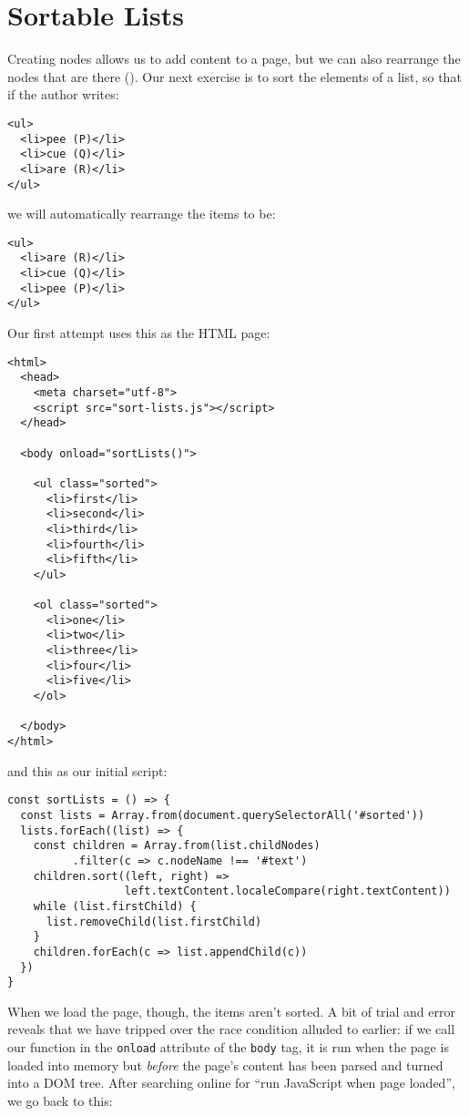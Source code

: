 \section{Sortable Lists}\label{s:pages-sort-list}

Creating nodes allows us to add content to a page,
but we can also rearrange the nodes that are there ().
Our next exercise is to sort the elements of a list,
so that if the author writes:

\begin{verbatim}
<ul>
  <li>pee (P)</li>
  <li>cue (Q)</li>
  <li>are (R)</li>
</ul>
\end{verbatim}

\noindent
we will automatically rearrange the items to be:

\begin{verbatim}
<ul>
  <li>are (R)</li>
  <li>cue (Q)</li>
  <li>pee (P)</li>
</ul>
\end{verbatim}

Our first attempt uses this as the HTML page:

\begin{verbatim}
<html>
  <head>
    <meta charset="utf-8">
    <script src="sort-lists.js"></script>
  </head>

  <body onload="sortLists()">

    <ul class="sorted">
      <li>first</li>
      <li>second</li>
      <li>third</li>
      <li>fourth</li>
      <li>fifth</li>
    </ul>

    <ol class="sorted">
      <li>one</li>
      <li>two</li>
      <li>three</li>
      <li>four</li>
      <li>five</li>
    </ol>

  </body>
</html>
\end{verbatim}

\noindent
and this as our initial script:

\begin{verbatim}
const sortLists = () => {
  const lists = Array.from(document.querySelectorAll('#sorted'))
  lists.forEach((list) => {
    const children = Array.from(list.childNodes)
          .filter(c => c.nodeName !== '#text')
    children.sort((left, right) =>
                  left.textContent.localeCompare(right.textContent))
    while (list.firstChild) {
      list.removeChild(list.firstChild)
    }
    children.forEach(c => list.appendChild(c))
  })
}
\end{verbatim}

When we load the page,
though,
the items aren't sorted.
A bit of trial and error reveals that we have tripped over the race condition alluded to earlier:
if we call our function in the \texttt{onload} attribute
of the \texttt{body} tag,
it is run when the page is loaded into memory
but \emph{before} the page's content has been parsed and turned into a DOM tree.
After searching online for ``run JavaScript when page loaded'',
we go back to this:

